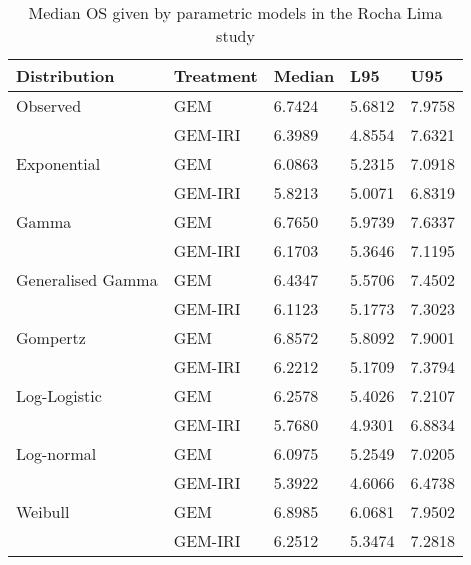 \begin{table}
    \center
    \begin{tabular}{lllll}
    \hline
    Distribution      & Treatment & Median & L95    & U95    \\ \hline
    Observed          & GEM       & 6.7424 & 5.6812 & 7.9758 \\
                      & GEM-IRI   & 6.3989 & 4.8554 & 7.6321 \\ \hline
    Exponential       & GEM       & 6.0863 & 5.2315 & 7.0918 \\
                      & GEM-IRI   & 5.8213 & 5.0071 & 6.8319 \\
    Gamma             & GEM       & 6.7650 & 5.9739 & 7.6337 \\
                      & GEM-IRI   & 6.1703 & 5.3646 & 7.1195 \\
    Generalised Gamma & GEM       & 6.4347 & 5.5706 & 7.4502 \\
                      & GEM-IRI   & 6.1123 & 5.1773 & 7.3023 \\
    Gompertz          & GEM       & 6.8572 & 5.8092 & 7.9001 \\
                      & GEM-IRI   & 6.2212 & 5.1709 & 7.3794 \\
    Log-Logistic      & GEM       & 6.2578 & 5.4026 & 7.2107 \\
                      & GEM-IRI   & 5.7680 & 4.9301 & 6.8834 \\
    Log-normal        & GEM       & 6.0975 & 5.2549 & 7.0205 \\
                      & GEM-IRI   & 5.3922 & 4.6066 & 6.4738 \\
    Weibull           & GEM       & 6.8985 & 6.0681 & 7.9502 \\
                      & GEM-IRI   & 6.2512 & 5.3474 & 7.2818 \\ \hline
    \end{tabular}
    \caption{Median OS given by parametric models in the Rocha Lima study}
    \label{rochalimaModelMedians}
\end{table}